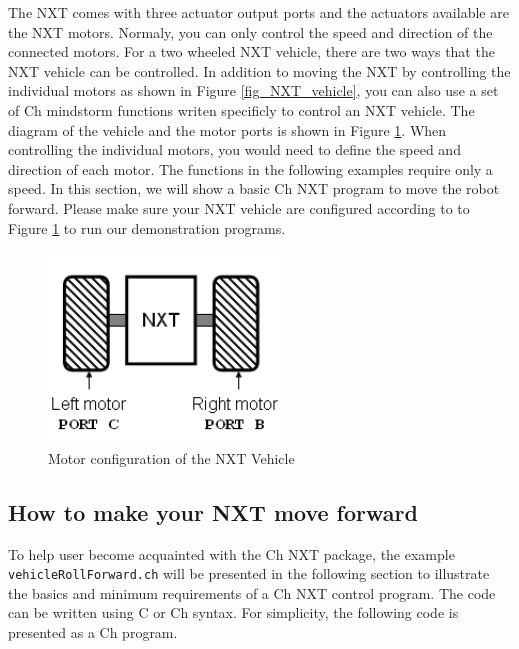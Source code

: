 \documentclass[11pt]{article}
\begin{document}
\noindent
The NXT comes with three actuator output ports and the actuators available are the NXT motors. 
Normaly, you can only control the speed and direction of the connected motors. For a two wheeled NXT 
vehicle, there are two ways that the NXT vehicle can be controlled.  In addition to moving the NXT by
controlling the individual motors as shown in Figure \ref{fig_NXT_vehicle}, you can also use a set of
Ch mindstorm functions writen specificly to control an NXT vehicle. The diagram of the vehicle and 
the motor ports is shown in Figure \ref{fig_NXT_vehport}. When controlling the individual motors, you
would need to define the speed and direction of each motor.  The functions in the following examples 
require only a speed. In this section, we will show a basic Ch NXT program to move the robot forward.
Please make sure your NXT vehicle are configured according to to Figure \ref{fig_NXT_vehport} to run 
our demonstration programs.\\
\begin{figure}[h]
  \begin{center}
    \includegraphics[height=2in]{figure/mindstorm/Vehicle.png}
    \caption{Motor configuration of the NXT Vehicle \label{fig_NXT_vehport}}
  \end{center}
\end{figure}
\subsection{How to make your NXT move forward}
To help user become acquainted with the Ch NXT package, the example \verb+vehicleRollForward.ch+ will
be presented in the following section to illustrate the basics and minimum requirements of a Ch NXT 
control program. The code can be written using C or Ch syntax. For simplicity, the following code is 
presented as a Ch program.
\begin{Program}[H]
    {\small}
    \caption{\texttt{forward.ch} Source Code\label{prog_forward.ch}}
\end{Program}
\end{document}
